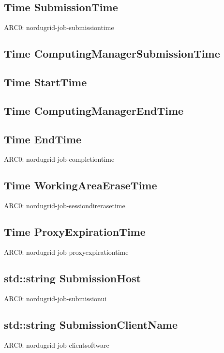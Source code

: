 \documentclass{book}
\begin{document}
\subsection*{Time SubmissionTime}

ARC0: nordugrid-job-submissiontime

\subsection*{Time ComputingManagerSubmissionTime}

\subsection*{Time StartTime}

\subsection*{Time ComputingManagerEndTime}

\subsection*{Time EndTime}

ARC0: nordugrid-job-completiontime

\subsection*{Time WorkingAreaEraseTime}

ARC0: nordugrid-job-sessiondirerasetime

\subsection*{Time ProxyExpirationTime}

ARC0: nordugrid-job-proxyexpirationtime

\subsection*{std::string SubmissionHost}

ARC0: nordugrid-job-submissionui

\subsection*{std::string SubmissionClientName}

ARC0: nordugrid-job-clientsoftware
\end{document}

